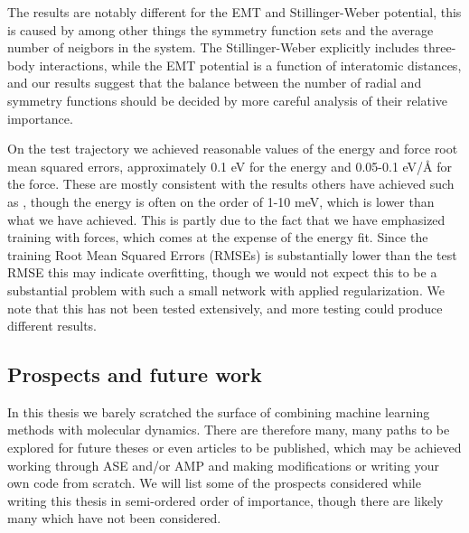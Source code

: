 The results are notably different for the EMT and Stillinger-Weber potential,
this is caused by among other things the symmetry function sets and the
average number of neigbors in the system.
The Stillinger-Weber explicitly includes three-body interactions,
while the EMT potential is a function of interatomic distances, and our
results suggest that the balance between the number of radial and symmetry functions
should be decided by more careful analysis of their relative importance.
\par
On the test trajectory we achieved reasonable values of the energy and force
root mean squared errors, approximately 0.1 eV for the energy and 0.05-0.1 eV/Å
for the force. These are mostly consistent with the results others have achieved
such as \cite{stende2017constructing, treider2017speeding, khorshidi2016amp,
    PhysRevLett.120.143001},
though the energy is often on the order of 1-10 meV, which is lower than
what we have achieved. This is partly due to the fact that we have emphasized
training with forces, which comes at the expense of the energy fit.
Since the training Root Mean Squared Errors (RMSEs) 
is substantially lower than the test RMSE this may
indicate overfitting, though we would not expect this to be a substantial problem
with such a small network with applied regularization.
We note that this has not been tested extensively,
and more testing could produce different results.

\subsection{Prospects and future work}
In this thesis we barely scratched the surface of combining machine learning
methods with molecular dynamics. There are therefore many, many paths
to be explored for future theses or even articles to be published,
which may be achieved working through ASE and/or AMP and making modifications
or writing your own code from scratch. We will list some of the prospects
considered while writing this thesis in semi-ordered order of importance,
though there are likely many which have not been considered.

